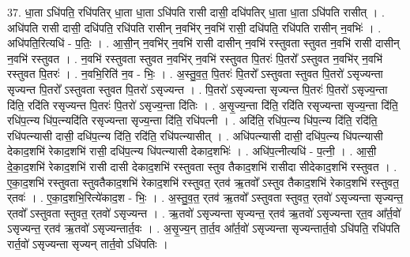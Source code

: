 \documentclass[17pt]{extarticle}
\begin{document}
37. धा॒ता ऽधि॑पति॒ रधि॑पतिर् धा॒ता धा॒ता ऽधि॑पति रासी दासी॒ दधि॑पतिर् धा॒ता धा॒ता ऽधि॑पति रासीत् । . अधि॑पति रासी दासी॒ दधि॑पति॒ रधि॑पति रासीन् न॒वभि॑र् न॒वभि॑ रासी॒ दधि॑पति॒ रधि॑पति रासीन् न॒वभिः॑ । . अधि॑पति॒रित्यधि॑ - प॒तिः॒ । . आ॒सी॒न् न॒वभि॑र् न॒वभि॑ रासी दासीन् न॒वभि॑ रस्तुवता स्तुवत न॒वभि॑ रासी दासीन् न॒वभि॑ रस्तुवत । . न॒वभि॑ रस्तुवता स्तुवत न॒वभि॑र् न॒वभि॑ रस्तुवत पि॒तरः॑ पि॒तरो᳚ ऽस्तुवत न॒वभि॑र् न॒वभि॑ रस्तुवत पि॒तरः॑ । . न॒वभि॒रिति॑ न॒व - भिः॒ । . अ॒स्तु॒व॒त॒ पि॒तरः॑ पि॒तरो᳚ ऽस्तुवता स्तुवत पि॒तरो॑ ऽसृज्यन्ता सृज्यन्त पि॒तरो᳚ ऽस्तुवता स्तुवत पि॒तरो॑ ऽसृज्यन्त । . पि॒तरो॑ ऽसृज्यन्ता सृज्यन्त पि॒तरः॑ पि॒तरो॑ ऽसृज्य॒न्ता दि॑ति॒ रदि॑ति रसृज्यन्त पि॒तरः॑ पि॒तरो॑ ऽसृज्य॒न्ता दि॑तिः । . अ॒सृ॒ज्य॒न्ता दि॑ति॒ रदि॑ति रसृज्यन्ता सृज्य॒न्ता दि॑ति॒ रधि॑प॒त्न्य धि॑प॒त्न्यदि॑ति रसृज्यन्ता सृज्य॒न्ता दि॑ति॒ रधि॑पत्नी । . अदि॑ति॒ रधि॑प॒त्न्य धि॑प॒त्न्य दि॑ति॒ रदि॑ति॒ रधि॑पत्न्यासी दासी॒ दधि॑प॒त्न्य दि॑ति॒ रदि॑ति॒ रधि॑पत्न्यासीत् । . अधि॑पत्न्यासी दासी॒ दधि॑प॒त्न्य धि॑पत्न्यासी देकाद॒शभि॑ रेकाद॒शभि॑ रासी॒ दधि॑प॒त्न्य धि॑पत्न्यासी देकाद॒शभिः॑ । . अधि॑प॒त्नीत्यधि॑ - प॒त्नी॒ । . आ॒सी॒ दे॒का॒द॒शभि॑ रेकाद॒शभि॑ रासी दासी देकाद॒शभि॑ रस्तुवता स्तुव तैकाद॒शभि॑ रासीदा सीदेकाद॒शभि॑ रस्तुवत । . ए॒का॒द॒शभि॑ रस्तुवता स्तुवतैकाद॒शभि॑ रेकाद॒शभि॑ रस्तुवत॒ र्‌तव॑ ऋ॒तवो᳚ ऽस्तुव तैकाद॒शभि॑ रेकाद॒शभि॑ रस्तुवत॒ र्‌तवः॑ । . ए॒का॒द॒शभि॒रित्ये॑काद॒श - भिः॒ । . अ॒स्तु॒व॒त॒ र्‌तव॑ ऋ॒तवो᳚ ऽस्तुवता स्तुवत॒ र्‌तवो॑ ऽसृज्यन्ता सृज्यन्त॒ र्‌तवो᳚ ऽस्तुवता स्तुवत॒ र्‌तवो॑ ऽसृज्यन्त । . ऋ॒तवो॑ ऽसृज्यन्ता सृज्यन्त॒ र्‌तव॑ ऋ॒तवो॑ ऽसृज्यन्ता र्‌त॒व आ᳚र्त॒वो॑ ऽसृज्यन्त॒ र्‌तव॑ ऋ॒तवो॑ 
ऽसृज्यन्तार्त॒वः । . अ॒सृ॒ज्य॒न् ता॒र्त॒व आ᳚र्त॒वो॑ ऽसृज्यन्ता सृज्यन्तार्त॒वो ऽधि॑पति॒ रधि॑पति रार्त॒वो॑ ऽसृज्यन्ता सृज्यन् तार्त॒वो ऽधि॑पतिः । \newline
\end{document}
